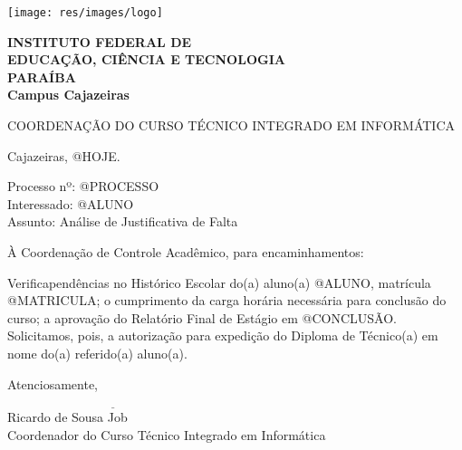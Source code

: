 \documentclass[a4paper, 12pt]{letter}
\begin{document}
\hspace{1.4cm}
\begin{minipage}{.19\textwidth}
    \texttt{[image: res/images/logo]}
\end{minipage}
\begin{minipage}[t]{\textwidth}
        \vspace{.001cm}
        {\bf
            {\selectfont
                INSTITUTO FEDERAL DE\\
                EDUCAÇÃO, CIÊNCIA E TECNOLOGIA\\
                {\color{green}
                    PARAÍBA\\
                    Campus Cajazeiras
                }
            }
        }
\end{minipage}
{\bf
{\selectfont
    \begin{center}
        {\selectfont
            COORDENAÇÃO DO CURSO TÉCNICO INTEGRADO EM INFORMÁTICA
        }
    \end{center}
}

\begin{flushright}
Cajazeiras, @HOJE.
\end{flushright}

\noindent Processo nº: @PROCESSO\\
Interessado: @ALUNO\\
Assunto: Análise de Justificativa de Falta

\noindent À Coordenação de Controle Acadêmico, para encaminhamentos:

\onehalfspacing Verificapendências no Histórico Escolar do(a) aluno(a)\linebreak
@ALUNO, matrícula @MATRICULA; o cumprimento da carga horária necessária para conclusão do curso; a aprovação do Relatório Final de Estágio  em @CONCLUSÃO. Solicitamos, pois, a autorização para expedição do Diploma de Técnico(a) em nome do(a) referido(a) aluno(a).

Atenciosamente,

\indent $\underline{\hspace{7cm}}$\\
\indent Ricardo de Sousa Job\\
\indent Coordenador do Curso Técnico Integrado em Informática\\
}
\end{document}
